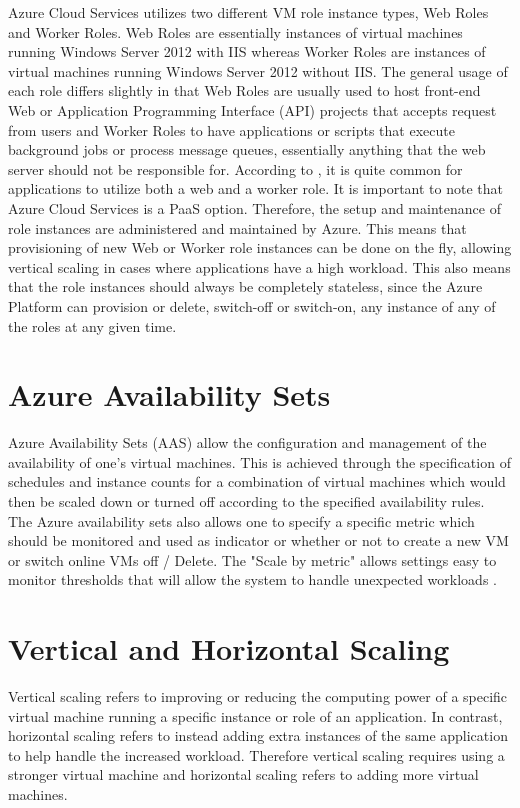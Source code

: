 Azure Cloud Services utilizes two different VM role instance types, Web Roles and Worker Roles. Web Roles are essentially instances of virtual machines running Windows Server 2012 with IIS whereas Worker Roles are instances of virtual machines running Windows Server 2012 without IIS. The general usage of each role differs slightly in that Web Roles are usually used to host front-end Web or Application Programming Interface (API) projects that accepts request from users and Worker Roles to have applications or scripts that execute background jobs or process message queues, essentially anything that the web server should not be responsible for. According to \cite{Microsoft_Corporation_undated-ej}, it is quite common for applications to utilize both a web and a worker role. It is important to note that Azure Cloud Services is a PaaS option. Therefore, the setup and maintenance of role instances are administered and maintained by Azure. This means that provisioning of new Web or Worker role instances can be done on the fly, allowing vertical scaling in cases where applications have a high workload. This also means that the role instances should always be completely stateless, since the Azure Platform can provision or delete, switch-off or switch-on, any instance of any of the roles at any given time.

\section{Azure Availability Sets}

Azure Availability Sets (AAS) allow the configuration and management of the availability of one's virtual machines. This is achieved through the specification of schedules and instance counts for a combination of virtual machines which would then be scaled down or turned off according to the specified availability rules. The Azure availability sets also allows one to specify a specific metric which should be monitored and used as indicator or whether or not to create a new VM or switch online VMs off / Delete. The "Scale by metric" allows settings easy to monitor thresholds that will allow the system to handle unexpected workloads \cite{Jelen2011}.

\section{Vertical and Horizontal Scaling}

Vertical scaling refers to improving or reducing the computing power of a specific virtual machine running a specific instance or role of an application. In contrast, horizontal scaling refers to instead adding extra instances of the same application to help handle the increased workload. Therefore vertical scaling requires using a stronger virtual machine and horizontal scaling refers to adding more virtual machines.
 
